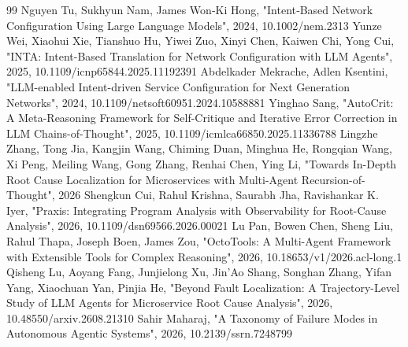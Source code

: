 \documentclass[conference]{IEEEtran}
\begin{document}
\begin{thebibliography}{99}
 Nguyen Tu, Sukhyun Nam, James Won‐Ki Hong, "Intent‐Based Network Configuration Using Large Language Models", 2024, 10.1002/nem.2313
 Yunze Wei, Xiaohui Xie, Tianshuo Hu, Yiwei Zuo, Xinyi Chen, Kaiwen Chi, Yong Cui, "INTA: Intent-Based Translation for Network Configuration with LLM Agents", 2025, 10.1109/icnp65844.2025.11192391
 Abdelkader Mekrache, Adlen Ksentini, "LLM-enabled Intent-driven Service Configuration for Next Generation Networks", 2024, 10.1109/netsoft60951.2024.10588881
 Yinghao Sang, "AutoCrit: A Meta-Reasoning Framework for Self-Critique and Iterative Error Correction in LLM Chains-of-Thought", 2025, 10.1109/icmlca66850.2025.11336788
 Lingzhe Zhang, Tong Jia, Kangjin Wang, Chiming Duan, Minghua He, Rongqian Wang, Xi Peng, Meiling Wang, Gong Zhang, Renhai Chen, Ying Li, "Towards In-Depth Root Cause Localization for Microservices with Multi-Agent Recursion-of-Thought", 2026
 Shengkun Cui, Rahul Krishna, Saurabh Jha, Ravishankar K. Iyer, "Praxis: Integrating Program Analysis with Observability for Root-Cause Analysis", 2026, 10.1109/dsn69566.2026.00021
 Lu Pan, Bowen Chen, Sheng Liu, Rahul Thapa, Joseph Boen, James Zou, "OctoTools: A Multi-Agent Framework with Extensible Tools for Complex Reasoning", 2026, 10.18653/v1/2026.acl-long.1
 Qisheng Lu, Aoyang Fang, Junjielong Xu, Jin'Ao Shang, Songhan Zhang, Yifan Yang, Xiaochuan Yan, Pinjia He, "Beyond Fault Localization: A Trajectory-Level Study of LLM Agents for Microservice Root Cause Analysis", 2026, 10.48550/arxiv.2608.21310
 Sahir Maharaj, "A Taxonomy of Failure Modes in Autonomous Agentic Systems", 2026, 10.2139/ssrn.7248799
\end{thebibliography}
\end{document}
